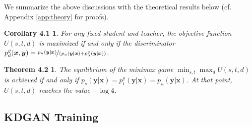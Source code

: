 \documentclass{article}
\newtheorem*{corollary1}{Corollary 4.1}
\newtheorem*{theorem1}{Theorem 4.2}
\newcommand{\OVEC}[1]{\bm{#1}} %
\newcommand{\kdganfullobj}{U(s,t,d)}
\newcommand{\kdganmin}{\min_{s,t}}
\newcommand{\kdganmax}{\max_{d}}
\newcommand{\fullpdat}{p_{u}(\OVEC{y}|\OVEC{x})}
\newcommand{\fullpstd}[1]{p_{s}(#1|\OVEC{x})}
\newcommand{\fullptch}[1]{p_{t}^{\varrho}(#1|\OVEC{x})}
\newcommand{\fullpdis}[1]{p_{d}^{\varrho}(\OVEC{x},#1)}
\newcommand{\fullpmix}{p_{\alpha}^{\varrho}(\OVEC{y}|\OVEC{x})}
\begin{document}
We summarize the above discussions with the theoretical results below (cf. Appendix \ref{app:theory} for proofs).
\begin{corollary1}
For any fixed student and teacher, the objective function $\kdganfullobj$ is maximized if and only if the discriminator $\fullpdis{\OVEC{y}}=\nicefrac{\fullpdat}{(\fullpdat+\fullpmix)}$.
\end{corollary1}%
\begin{theorem1}
The equilibrium of the minimax game $\kdganmin\kdganmax\kdganfullobj$ is achieved if and only if $\fullpstd{\OVEC{y}}=\fullptch{\OVEC{y}}=\fullpdat$. At that point, $\kdganfullobj$ reaches the value $-\log 4$.
\end{theorem1}%

\subsection{KDGAN Training} \label{sec:kdgan training}
\end{document}
